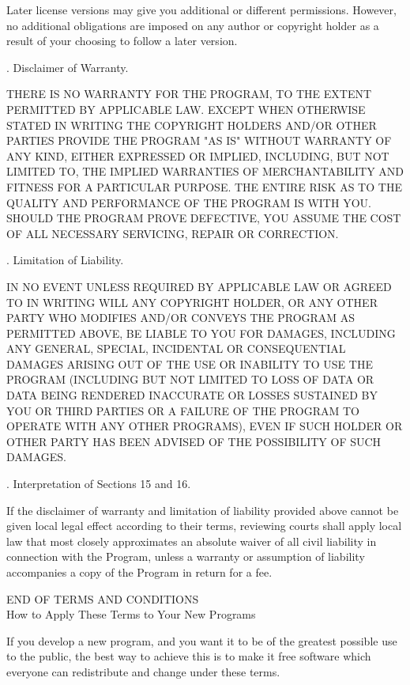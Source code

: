 Later license versions may give you additional or different
permissions.  However, no additional obligations are imposed on any
author or copyright holder as a result of your choosing to follow a
later version.

. Disclaimer of Warranty.

THERE IS NO WARRANTY FOR THE PROGRAM, TO THE EXTENT PERMITTED BY
APPLICABLE LAW.  EXCEPT WHEN OTHERWISE STATED IN WRITING THE COPYRIGHT
HOLDERS AND/OR OTHER PARTIES PROVIDE THE PROGRAM "AS IS" WITHOUT WARRANTY
OF ANY KIND, EITHER EXPRESSED OR IMPLIED, INCLUDING, BUT NOT LIMITED TO,
THE IMPLIED WARRANTIES OF MERCHANTABILITY AND FITNESS FOR A PARTICULAR
PURPOSE.  THE ENTIRE RISK AS TO THE QUALITY AND PERFORMANCE OF THE PROGRAM
IS WITH YOU.  SHOULD THE PROGRAM PROVE DEFECTIVE, YOU ASSUME THE COST OF
ALL NECESSARY SERVICING, REPAIR OR CORRECTION.

. Limitation of Liability.

IN NO EVENT UNLESS REQUIRED BY APPLICABLE LAW OR AGREED TO IN WRITING
WILL ANY COPYRIGHT HOLDER, OR ANY OTHER PARTY WHO MODIFIES AND/OR CONVEYS
THE PROGRAM AS PERMITTED ABOVE, BE LIABLE TO YOU FOR DAMAGES, INCLUDING ANY
GENERAL, SPECIAL, INCIDENTAL OR CONSEQUENTIAL DAMAGES ARISING OUT OF THE
USE OR INABILITY TO USE THE PROGRAM (INCLUDING BUT NOT LIMITED TO LOSS OF
DATA OR DATA BEING RENDERED INACCURATE OR LOSSES SUSTAINED BY YOU OR THIRD
PARTIES OR A FAILURE OF THE PROGRAM TO OPERATE WITH ANY OTHER PROGRAMS),
EVEN IF SUCH HOLDER OR OTHER PARTY HAS BEEN ADVISED OF THE POSSIBILITY OF
SUCH DAMAGES.

. Interpretation of Sections 15 and 16.

If the disclaimer of warranty and limitation of liability provided
above cannot be given local legal effect according to their terms,
reviewing courts shall apply local law that most closely approximates
an absolute waiver of all civil liability in connection with the
Program, unless a warranty or assumption of liability accompanies a
copy of the Program in return for a fee.

\vparasmall
END OF TERMS AND CONDITIONS \\

\vparasmall
How to Apply These Terms to Your New Programs

\vparasmall
If you develop a new program, and you want it to be of the greatest
possible use to the public, the best way to achieve this is to make it
free software which everyone can redistribute and change under these terms.


